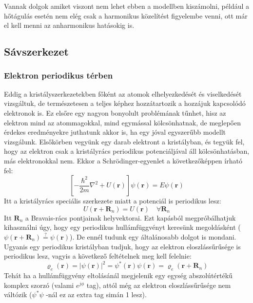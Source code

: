 \documentclass[../main.tex]{subfiles}
\begin{document}
Vannak dolgok amiket viszont nem lehet ebben a modellben kiszámolni, például a hőtágulás esetén nem elég csak a harmonikus közelítést figyelembe venni, ott már el kell menni az anharmonikus hatásokig is.

\subsection{Sávszerkezet}
\subsubsection{Elektron periodikus térben}
Eddig a kristályszerkezetekben főként az atomok elhelyezkedését és viselkedését vizsgáltuk, de természetesen a teljes képhez hozzátartozik a hozzájuk kapcsolódó elektronok is.
Ez elsőre egy nagyon bonyolult problémának tűnhet, hisz az elektron mind az atommagokkal, mind egymással kölcsönhatnak, de meglepően érdekes eredményekre juthatunk akkor is,
ha egy jóval egyszerűbb modellt vizsgálunk. Elsőkörben vegyünk egy darab elektront a kristályban, és tegyük fel, hogy az elektron csak a kristályrács periodikus potenciáljával áll kölcsönhatásban, más elektronokkal nem.
Ekkor a Schrödinger-egyenlet a következőképpen írható fel:
\begin{equation}
    \left[-\frac{\hbar^2}{2m} \nabla^2 + U(\mathbf{r})\right] \psi(\mathbf{r}) = E \psi(\mathbf{r})
\end{equation}
Itt a kristályrács speciális szerkezete miatt a potenciál is periodikus lesz:
\begin{equation}
    U(\mathbf{r} + \mathbf{R}_n) = U(\mathbf{r}) \quad \forall \mathbf{R}_n
\end{equation}
Itt $\mathbf{R}_n$ a Bravais-rács pontjainak helyvektorai. Ezt kapásból megpróbálhatjuk kihasználni úgy, hogy egy periodikus hullámfüggvényt keresünk megoldásként ($\psi(\mathbf{r} + \mathbf{R}_n) \stackrel{?}{=} \psi(\mathbf{r})$).
De ennél tudunk egy általánosabb dolgot is mondani. Ugyanis egy periodikus kristályban tudjuk, hogy az elektron eloszlássűrűsége is periodikus lesz, vagyis a következő feltételnek meg kell felelnie:
\begin{equation}
    \varrho_e (\mathbf{r}) = |\psi(\mathbf{r})|^2 =\psi^*(\mathbf{r}) \psi(\mathbf{r}) = \varrho_e (\mathbf{r} + \mathbf{R}_n)
\end{equation}
Tehát ha a hullámfüggvény eltolásánál megjelenik egy egység abszolútértékű komplex szorzó (valami $e^{j \phi}$ tag), attól még az elektron eloszlássűrűsége nem váltózik ($\psi^* \psi$ -nál ez az extra tag simán 1 lesz). 
\end{document}
